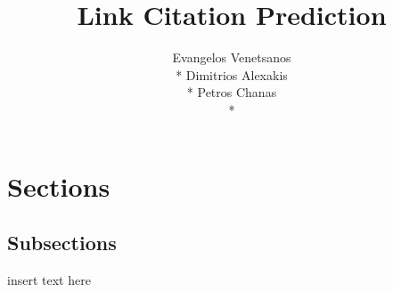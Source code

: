 \documentclass[12pt]{article}
\title{Link Citation Prediction}
\author{Evangelos Venetsanos \\*
Dimitrios Alexakis \\*
Petros Chanas\\*}
\begin{document}
\maketitle

\section{Sections}
\subsection{Subsections}
insert text here
\end{document}
